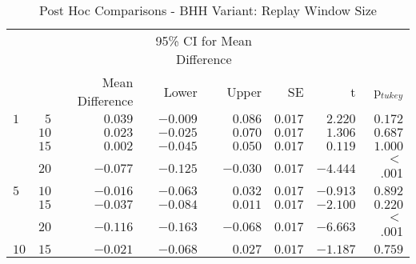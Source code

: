 \begin{table}[H]
	\centering
	\caption{Post Hoc Comparisons - BHH Variant: Replay Window Size}
	\label{tab:results:replay:post_hoc}%
	\par\bigskip
	\resizebox{0.95\textwidth}{!}
	{
		\begin{tabular}{lrrrrrrr}
			\toprule
			\multicolumn{1}{c}{} & \multicolumn{1}{c}{} & \multicolumn{1}{c}{} & \multicolumn{2}{c}{95\% CI for Mean Difference} & \multicolumn{1}{c}{} & \multicolumn{1}{c}{} & \multicolumn{1}{c}{}               \\
			\cline{4-5}
			$ $                  & $ $                  & Mean Difference      & Lower                                           & Upper                & SE                   & t                    & p$_{tukey}$ \\
			\cmidrule[0.4pt]{1-8}
			$1$                  & $5$                  & $0.039$              & $-0.009$                                        & $0.086$              & $0.017$              & $2.220$              & $0.172$     \\
			$ $                  & $10$                 & $0.023$              & $-0.025$                                        & $0.070$              & $0.017$              & $1.306$              & $0.687$     \\
			                     & $15$                 & $0.002$              & $-0.045$                                        & $0.050$              & $0.017$              & $0.119$              & $1.000$     \\
			                     & $20$                 & $-0.077$             & $-0.125$                                        & $-0.030$             & $0.017$              & $-4.444$             & $<$ .001    \\
			$5$                  & $10$                 & $-0.016$             & $-0.063$                                        & $0.032$              & $0.017$              & $-0.913$             & $0.892$     \\
			$ $                  & $15$                 & $-0.037$             & $-0.084$                                        & $0.011$              & $0.017$              & $-2.100$             & $0.220$     \\
			                     & $20$                 & $-0.116$             & $-0.163$                                        & $-0.068$             & $0.017$              & $-6.663$             & $<$ .001    \\
			$10$                 & $15$                 & $-0.021$             & $-0.068$                                        & $0.027$              & $0.017$              & $-1.187$             & $0.759$     \\

\end{tabular}}
\end{table}
